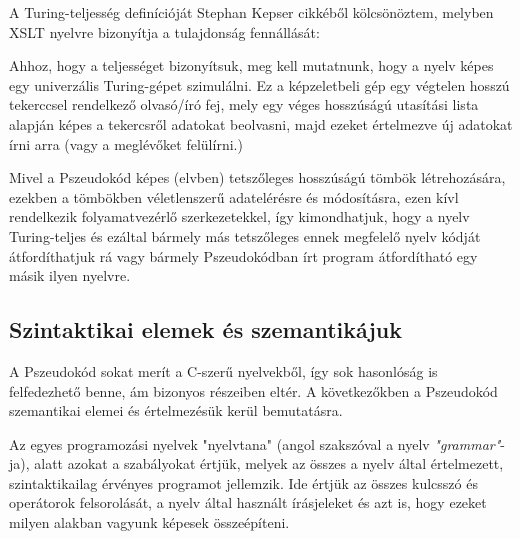 A Turing-teljesség definícióját Stephan Kepser cikkéből kölcsönöztem, melyben XSLT nyelvre bizonyítja a tulajdonság fennállását:

\cite{turing}

Ahhoz, hogy a teljességet bizonyítsuk, meg kell mutatnunk, hogy a nyelv képes egy univerzális Turing-gépet szimulálni. Ez a képzeletbeli gép egy végtelen hosszú tekerccsel rendelkező olvasó/író fej, mely egy véges hosszúságú utasítási lista alapján képes a tekercsről adatokat beolvasni, majd ezeket értelmezve új adatokat írni arra (vagy a meglévőket felülírni.)

Mivel a Pszeudokód képes (elvben) tetszőleges hosszúságú tömbök létrehozására, ezekben a tömbökben véletlenszerű adatelérésre és módosításra, ezen kívl rendelkezik folyamatvezérlő szerkezetekkel, így kimondhatjuk, hogy a nyelv Turing-teljes és ezáltal bármely más tetszőleges ennek megfelelő nyelv kódját átfordíthatjuk rá vagy bármely Pszeudokódban írt program átfordítható egy másik ilyen nyelvre.

\subsection{Szintaktikai elemek és szemantikájuk}

A Pszeudokód sokat merít a C-szerű nyelvekből, így sok hasonlóság is felfedezhető benne, ám bizonyos részeiben eltér. A következőkben a Pszeudokód szemantikai elemei és értelmezésük kerül bemutatásra.

Az egyes programozási nyelvek "nyelvtana" (angol szakszóval a nyelv \textit{"grammar"}-ja), alatt azokat a szabályokat értjük, melyek az összes a nyelv által értelmezett, szintaktikailag érvényes programot jellemzik. Ide értjük az összes kulcsszó és operátorok felsorolását, a nyelv által használt írásjeleket és azt is, hogy ezeket milyen alakban vagyunk képesek összeépíteni.


